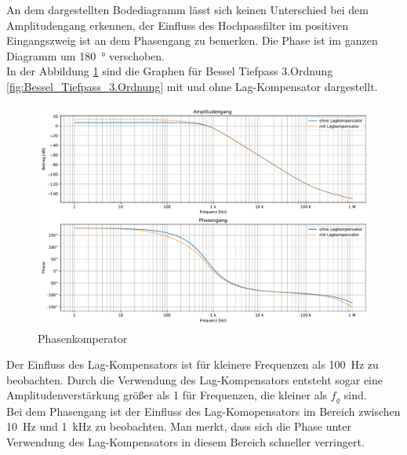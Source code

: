 An dem dargestellten Bodediagramm lässt sich keinen Unterschied bei dem Amplitudengang erkennen, der Einfluss des Hochpassfilter im positiven Eingangszweig ist an dem Phasengang zu bemerken. Die Phase ist im ganzen Diagramm um \SI{180}{\degree} verschoben.\\

In der Abbildung \ref{fig:Phasenkomperator} sind die Graphen für Bessel Tiefpass 3.Ordnung \ref{fig:Bessel_Tiefpass_3.Ordnung} mit und ohne Lag-Kompensator dargestellt.

\begin{figure}[H]
 \centering
 \includegraphics[width=0.7\linewidth]{Elektronik-Laborprotokoll_Filter/Plots/Bode_Phasenkompensatoren.pdf}
 \caption{Phasenkomperator }
 \label{fig:Phasenkomperator}
\end{figure}
%
Der Einfluss des Lag-Kompensators ist für kleinere Frequenzen als \SI{100}{\hertz} zu beobachten. Durch die Verwendung des Lag-Kompensators entsteht sogar eine Amplitudenverstärkung größer als 1 für Frequenzen, die kleiner als $f_g$ sind.\\

Bei dem Phasengang ist der Einfluss des Lag-Komopensators im Bereich zwischen \SI{10}{\hertz} und \SI{1}{\kilo\hertz} zu beobachten. Man merkt, dass sich die Phase unter Verwendung des Lag-Kompensators in diesem Bereich schneller verringert.



